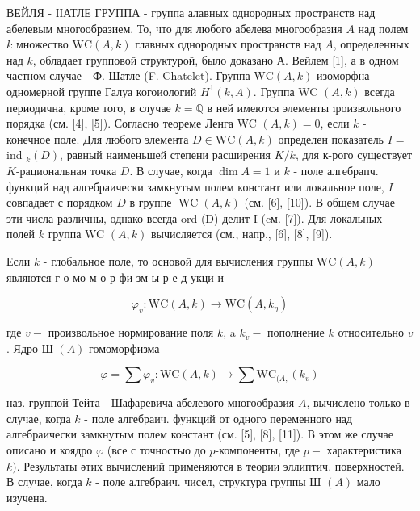 \documentclass[10pt]{article}
\begin{document}
ВЕЙЛЯ - ІІАТЛЕ ГРУППА - группа алавных однородных пространств над абелевым многообразием. То, что для любого абелева многообразия $A$ над полем $k$ множество $\mathrm{WC}(A, k)$ главных однородных пространств над $A$, определенных над $k$, обладает групповой структурой, было доказано А. Вейлем [1], а в одном частном случае - Ф. Шатле (F. Chatelet). Группа $\mathrm{WC}(A, k)$ изоморфна одномерной группе Галуа когоиологий $H^{1}(k, A)$. Группа WC $(A, k)$ всегда периодична, кроме того, в случае $k=\mathbb{Q}$ в ней имеются элементы ıроизвольного порядка (см. [4], [5]). Согласно теореме Ленга WC $(A, k)=0$, если $k$ - конечное поле. Для любого элемента $D \in \mathrm{WC}(A, k)$ определен показатель $I=$ ind $_{k}(D)$, равный наименьшей степени расширения $K / k$, для к-рого существует $K$-рациональная точка $D$. В случае, когда $\operatorname{dim} A=1$ и $k$ - поле алгебрапч. функций над алгебраически замкнутым полем констант или локальное поле, $I$ совпадает с порядком $D$ в группе $\operatorname{WC}(A, k)$ (см. [6], [10]). В общем случае эти числа различны, однако всегда ord (D) делит I (cм. [7]). Для локальных полей $k$ группа WC $(A, k)$ вычисляется (см., напр., [6], [8], [9]).



Если $k$ - глобальное поле, то основой для вычисления группы $\mathrm{WC}(A, k)$ являются г о мо м о р фи зм ы р е д укци и



\[

\varphi_{v}: \mathrm{WC}(A, k) \longrightarrow \mathrm{WC}\left(A, k_{\eta}\right)

\]



где $v-$ произвольное нормирование поля $k$, a $k_{v}-$ пополнение $k$ относительно $v$. Ядро Ш $(A)$ гомоморфизма



\[

\varphi=\sum \varphi_{v}: \mathrm{WC}(A, k) \longrightarrow \sum \mathrm{WC}_{(A,}\left(k_{v}\right)

\]



наз. группой Тейта - Шафаревича абелевого многообразия $A$, вычислено только в случае, когда $k$ - поле алгебраич. функций от одного переменного над алгебраически замкнутым полем констант (см. [5], [8], [11]). В этом же случае описано и коядро $\varphi$ (все с точностыо до $p$-компоненты, где $p-$ характеристика $k)$. Результаты әтих вычислений применяются в теории эллиптич. поверхностей. В случае, когда $k$ - поле алгебраич. чисел, структура группы Ш $(A)$ мало изучена.
\end{document}
